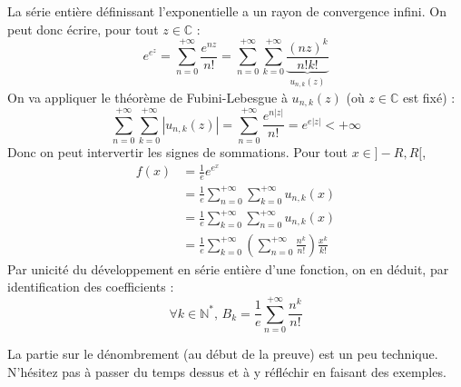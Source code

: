 \begin{demonstration}
		\medskip
		La série entière définissant l'exponentielle a un rayon de convergence infini. On peut donc écrire, pour tout $z \in \mathbb{C}$ :
		\[ e^{e^z} = \sum_{n=0}^{+\infty} \frac{e^{nz}}{n!} = \sum_{n=0}^{+\infty} \sum_{k=0}^{+\infty} \underbrace{\frac{(nz)^k}{n!k!}}_{u_{n,k}(z)} \]
		On va appliquer le théorème de Fubini-Lebesgue à $u_{n,k}(z)$ (où $z \in \mathbb{C}$ est fixé) :
		\[ \sum_{n=0}^{+\infty} \sum_{k=0}^{+\infty} |u_{n,k}(z)| = \sum_{n=0}^{+\infty} \frac{e^{n|z|}}{n!} = e^{e|z|} < +\infty \]
		Donc on peut intervertir les signes de sommations. Pour tout $x \in ]-R,R[$,
		\begin{align*}
			f(x) &= \frac{1}{e} e^{e^x} \\
			&= \frac{1}{e} \sum_{n=0}^{+\infty} \sum_{k=0}^{+\infty} u_{n,k}(x) \\
			&= \frac{1}{e} \sum_{k=0}^{+\infty} \sum_{n=0}^{+\infty} u_{n,k}(x) \\
			&= \frac{1}{e} \sum_{k=0}^{+\infty} \left( \sum_{n=0}^{+\infty} \frac{n^k}{n!} \right) \frac{x^k}{k!}
		\end{align*}
		Par unicité du développement en série entière d'une fonction, on en déduit, par identification des coefficients :
		\[ \forall k \in \mathbb{N}^*, \, B_k = \frac{1}{e} \sum_{n=0}^{+\infty} \frac{n^k}{n!} \]
	\end{demonstration}

	\begin{remark}
		La partie sur le dénombrement (au début de la preuve) est un peu technique. N'hésitez pas à passer du temps dessus et à y réfléchir en faisant des exemples.
	\end{remark}

